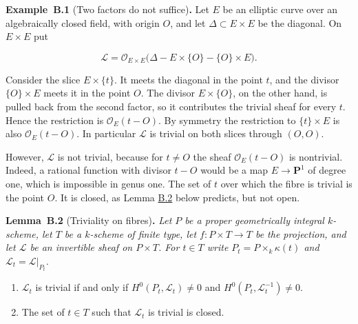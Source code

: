 \documentclass[11pt]{article}
\newenvironment{bpstatement}[2]{\par\addvspace{0.6\baselineskip}\noindent\textbf{#1}#2\textbf{.}\enspace\ignorespaces}
  {\par\addvspace{0.4\baselineskip}}
\newenvironment{bpstatementit}[2]{\begin{bpstatement}{#1}{#2}\itshape\ignorespaces}{\end{bpstatement}}
\begin{document}
\label{bp5}%
\begin{bpstatement}{Example~B.1}{ (Two factors do not suffice)}
Let \(E\) be an elliptic curve over an algebraically closed field, with origin \(O\), and let \(\Delta\subset E\times E\) be the diagonal. On \(E\times E\) put

\[
\mathcal L=\mathcal O_{E\times E}\bigl(\Delta-E\times\{O\}-\{O\}\times E\bigr).
\]

Consider the slice \(E\times\{t\}\). It meets the diagonal in the point \(t\), and the divisor \(\{O\}\times E\) meets it in the point \(O\). The divisor \(E\times\{O\}\), on the other hand, is pulled back from the second factor, so it contributes the trivial sheaf for every \(t\). Hence the restriction is \(\mathcal O_E(t-O)\). By symmetry the restriction to \(\{t\}\times E\) is also \(\mathcal O_E(t-O)\). In particular \(\mathcal L\) is trivial on both slices through \((O,O)\).

However, \(\mathcal L\) is not trivial, because for \(t\neq O\) the sheaf \(\mathcal O_E(t-O)\) is nontrivial. Indeed, a rational function with divisor \(t-O\) would be a map \(E\to\mathbf P^1\) of degree one, which is impossible in genus one. The set of \(t\) over which the fibre is trivial is the point \(O\). It is closed, as Lemma \hyperref[bp6]{B.2} below predicts, but not open.
\end{bpstatement}

\label{bp6}%
\begin{bpstatementit}{Lemma~B.2}{ (Triviality on fibres)}
Let \(P\) be a proper geometrically integral \(k\)-scheme, let \(T\) be a \(k\)-scheme of finite type, let \(f:P\times T\to T\) be the projection, and let \(\mathcal L\) be an invertible sheaf on \(P\times T\). For \(t\in T\) write \(P_t=P\times_k\kappa(t)\) and \(\mathcal L_t=\mathcal L|_{P_t}\).

\begin{enumerate}
\item \(\mathcal L_t\) is trivial if and only if \(H^0(P_t,\mathcal L_t)\ne0\) and \(H^0(P_t,\mathcal L_t^{-1})\ne0\).
\item The set of \(t\in T\) such that \(\mathcal L_t\) is trivial is closed.
\end{enumerate}
\end{bpstatementit}
\end{document}
